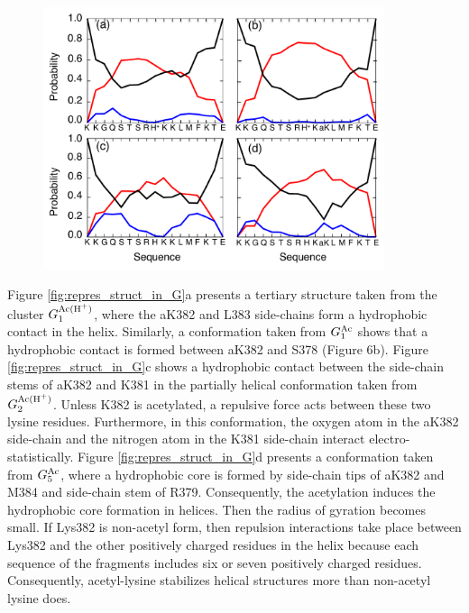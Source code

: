 \begin{figure}
  \centering
  \includegraphics[width=10cm]{../single_CTD/figures_p53ctd/5.pdf}
  \caption{\label{fig:ss_contents_p53}}
\end{figure}

Figure \ref{fig:repres_struct_in_G}a presents a tertiary structure taken from the cluster $G^{\rm Ac(H^+)}_1$, where the aK382 and L383 side-chains form a hydrophobic contact in the helix. Similarly, a conformation taken from $G^{\rm Ac}_1$ shows that a hydrophobic contact is formed between aK382 and S378 (Figure 6b). Figure \ref{fig:repres_struct_in_G}c shows a hydrophobic contact between the side-chain stems of aK382 and K381 in the partially helical conformation taken from $G^{\rm Ac(H^+)}_2$. Unless K382 is acetylated, a repulsive force acts between these two lysine residues. Furthermore, in this conformation, the oxygen atom in the aK382 side-chain and the nitrogen atom in the K381 side-chain interact electro-statistically. Figure \ref{fig:repres_struct_in_G}d presents a conformation taken from $G^{\rm Ac}_5$, where a hydrophobic core is formed by side-chain tips of aK382 and M384 and side-chain stem of R379. Consequently, the acetylation induces the hydrophobic core formation in helices. Then the radius of gyration becomes small. If Lys382 is non-acetyl form, then repulsion interactions take place between Lys382 and the other positively charged residues in the helix because each sequence of the fragments includes six or seven positively charged residues. Consequently, acetyl-lysine stabilizes helical structures more than non-acetyl lysine does.

